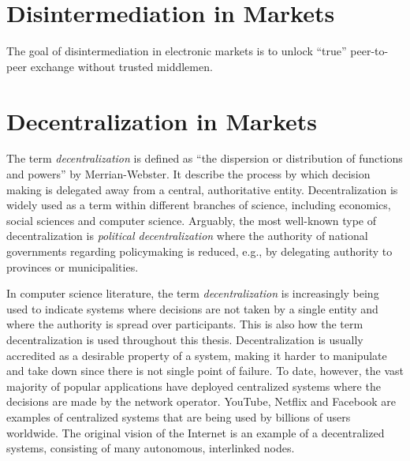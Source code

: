 \section{Disintermediation in Markets}
The goal of disintermediation in electronic markets is to unlock \enquote{true} peer-to-peer exchange without trusted middlemen.

\section{Decentralization in Markets}
The term \emph{decentralization} is defined as \enquote{the dispersion or distribution of functions and powers} by Merrian-Webster.
It describe the process by which decision making is delegated away from a central, authoritative entity.
Decentralization is widely used as a term within different branches of science, including economics, social sciences and computer science.
Arguably, the most well-known type of decentralization is \emph{political decentralization} where the authority of national governments regarding policymaking is reduced, e.g., by delegating authority to provinces or municipalities.

In computer science literature, the term \emph{decentralization} is increasingly being used to indicate systems where decisions are not taken by a single entity and where the authority is spread over participants.
This is also how the term decentralization is used throughout this thesis.
Decentralization is usually accredited as a desirable property of a system, making it harder to manipulate and take down since there is not single point of failure.
To date, however, the vast majority of popular applications have deployed centralized systems where the decisions are made by the network operator.
YouTube, Netflix and Facebook are examples of centralized systems that are being used by billions of users worldwide.
The original vision of the Internet is an example of a decentralized systems, consisting of many autonomous, interlinked nodes.



